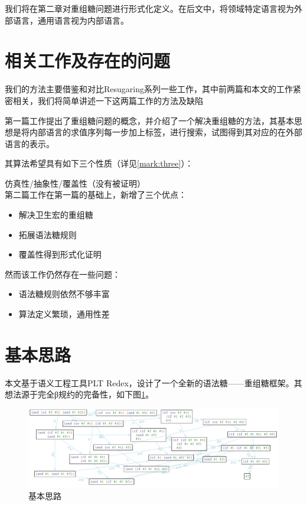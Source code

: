 我们将在第二章对重组糖问题进行形式化定义。在后文中，将领域特定语言视为外部语言，通用语言视为内部语言。

\section{相关工作及存在的问题}
我们的方法主要借鉴和对比Resugaring系列一些工作，其中前两篇和本文的工作紧密相关，我们将简单讲述一下这两篇工作的方法及缺陷

第一篇工作提出了重组糖问题的概念，并介绍了一个解决重组糖的方法，其基本思想是将内部语言的求值序列每一步加上标签，进行搜索，试图得到其对应的在外部语言的表示。

其算法希望具有如下三个性质（详见\ref{mark:three}）：

仿真性/抽象性/覆盖性（没有被证明）
\\[12pt]

第二篇工作在第一篇的基础上，新增了三个优点：

\begin{itemize}
	\item 解决卫生宏的重组糖
	\item 拓展语法糖规则
	\item 覆盖性得到形式化证明
\end{itemize}

然而该工作仍然存在一些问题：
\begin{itemize}
	\item 语法糖规则依然不够丰富
	\item 算法定义繁琐，通用性差
\end{itemize}

\section{基本思路}

本文基于语义工程工具PLT Redex，设计了一个全新的语法糖——重组糖框架。其想法源于完全β规约的完备性，如下图\ref{fig:base}。

\begin{figure}[h]
	\centering
	\includegraphics[width=12cm]{images/chapter1/example.png}
	\caption{基本思路}
	\label{fig:base}
\end{figure}


